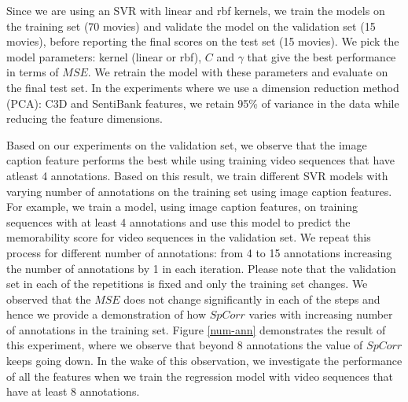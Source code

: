 \documentclass[sigconf]{acmart}
\begin{document}
Since we are using an SVR with linear and rbf kernels, we train the models on the training set (70 movies) and validate the model on the validation set (15 movies), before reporting the final scores on the test set (15 movies).
We pick the model parameters: kernel (linear or rbf), $C$ and $\gamma$ that give the best performance in terms of $MSE$.
We retrain the model with these parameters and evaluate on the final test set.
In the experiments where we use a dimension reduction method (PCA): C3D and SentiBank features, we retain 95\% of variance in the data while reducing the feature dimensions. 

Based on our experiments on the validation set, we observe that the image caption feature performs the best while using training video sequences that have atleast 4 annotations.
Based on this result, we train different SVR models with varying number of annotations on the training set using image caption features.
For example, we train a model, using image caption features, on training sequences with at least 4 annotations and use this model to predict the memorability score for video sequences in the validation set.
We repeat this process for different number of annotations: from 4 to 15 annotations increasing the number of annotations by 1 in each iteration.
Please note that the validation set in each of the repetitions is fixed and only the training set changes.
We observed that the $MSE$ does not change significantly in each of the steps and hence we provide a demonstration of how $SpCorr$ varies with increasing number of annotations in the training set.
Figure \ref{num-ann} demonstrates the result of this experiment, where we observe that beyond 8 annotations the value of $SpCorr$ keeps going down.
In the wake of this observation, we investigate the performance of all the features when we train the regression model with video sequences that have at least 8 annotations.
\end{document}
